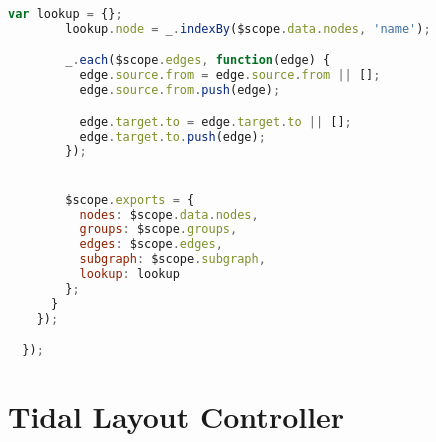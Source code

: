 \begin{lstlisting}[language=JavaScript]
        var lookup = {};
        lookup.node = _.indexBy($scope.data.nodes, 'name');

        _.each($scope.edges, function(edge) {
          edge.source.from = edge.source.from || [];
          edge.source.from.push(edge);

          edge.target.to = edge.target.to || [];
          edge.target.to.push(edge);
        });


        $scope.exports = {
          nodes: $scope.data.nodes,
          groups: $scope.groups,
          edges: $scope.edges,
          subgraph: $scope.subgraph,
          lookup: lookup
        };
      }
    });

  });
\end{lstlisting}



\section{Tidal Layout Controller}
\label{appendix-tidal-layoutCtrl}
